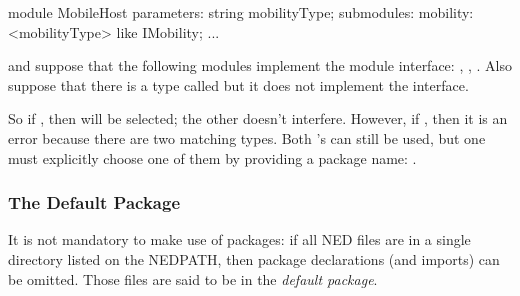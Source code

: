 \begin{ned}
module MobileHost
{
    parameters:
        string mobilityType;
    submodules:
        mobility: <mobilityType> like IMobility;
        ...
}
\end{ned}

and suppose that the following modules implement the  module
interface: , ,
. Also suppose that there is a type
called  but it does not implement the
interface.

So if , then
 will be selected; the other
 doesn't interfere. However, if
, then it is an error because there are two
matching  types. Both 's can still be used,
but one must explicitly choose one of them by providing a package name:
.


\subsubsection{The Default Package}

It is not mandatory to make use of packages: if all NED files are in a
single directory listed on the NEDPATH, then package declarations (and
imports) can be omitted. Those files are said to be in the \textit{default
package}.







